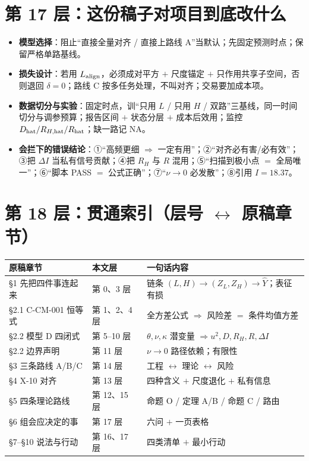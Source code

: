 \documentclass[UTF8,11pt,a4paper]{ctexart}
\begin{document}
\section{第 17 层：这份稿子对项目到底改什么}

\begin{itemize}
  \item \textbf{模型选择}：阻止``直接全量对齐 / 直接上路线 A''当默认；先固定预测时点；保留严格单路基线。
  \item \textbf{损失设计}：若用 $L_{\rm align}$，必须成对平方 $+$ 尺度锚定 $+$ 只作用共享子空间，否则退回 $\delta=0$；路线 C 按多任务处理，不叫对齐；交易要加成本项。
  \item \textbf{数据切分与实验}：固定时点，训``只用 $L$ / 只用 $H$ / 双路''三基线，同一时间切分与调参预算；报告区间 $+$ 状态分层 $+$ 成本后效用；监控 $D_{\rm hat}/R_{H,\rm hat}/R_{\rm hat}$；缺一路记 NA。
  \item \textbf{会拦下的错误结论}：①``高频更细 $\Rightarrow$ 一定有用''；②``对齐必有害/必有效''；③把 $\Delta I$ 当私有信号贡献；④把 $R_H$ 与 $R$ 混用；⑤``扫描到极小点 $=$ 全局唯一''；⑥``脚本 PASS $=$ 公式正确''；⑦``$\nu\to0$ 必发散''；⑧引用 $I=18.37$。
\end{itemize}

\section{第 18 层：贯通索引（层号 $\leftrightarrow$ 原稿章节）}

\begin{longtable}{p{}p{}p{}}
\toprule
原稿章节 & 本文层 & 一句话内容\\
\midrule
\S1 先把四件事连起来 & 第 0、3 层 & 链条 $(L,H)\to(Z_L,Z_H)\to\widehat Y$；表征有损\\
\S2.1 C-CM-001 恒等式 & 第 1、2、4 层 & 全方差公式 $\Rightarrow$ 风险差 $=$ 条件均值方差\\
\S2.2 模型 D 四闭式 & 第 5--10 层 & $\theta,\nu,\kappa$ 潜变量 $\Rightarrow u^2,D,R_H,R,\Delta I$\\
\S2.2 边界声明 & 第 11 层 & $\nu\to0$ 路径依赖；有限性\\
\S3 三条路线 A/B/C & 第 14 层 & 工程 $\leftrightarrow$ 理论 $\leftrightarrow$ 风险\\
\S4 X-10 对齐 & 第 13 层 & 四种含义 $+$ 尺度退化 $+$ 私有信息\\
\S5 四条理论路线 & 第 12、15 层 & 命题 O / 定理 A/B / 命题 C / 路由\\
\S6 组会应决定的事 & 第 17 层 & 六问 $+$ 一页表格\\
\S7--\S10 说法与行动 & 第 16、17 层 & 四类清单 $+$ 最小行动\\
\bottomrule
\end{longtable}
\end{document}
